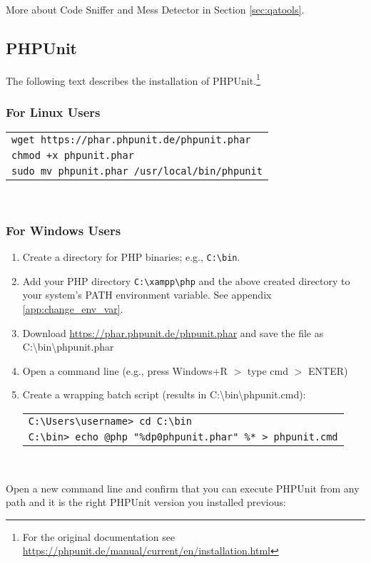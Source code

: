 \noindent
More about Code Sniffer and Mess Detector in Section \ref{sec:qatools}.

\newpage
\subsection{PHPUnit}
The following text describes the installation of PHPUnit.\footnote{For the original documentation see \url{https://phpunit.de/manual/current/en/installation.html}}

\subsubsection{For Linux Users}
\begin{tabular}{l}
	\texttt{wget https://phar.phpunit.de/phpunit.phar}\\
	\texttt{chmod +x phpunit.phar}\\
	\texttt{sudo mv phpunit.phar /usr/local/bin/phpunit}\\
\end{tabular}\\

\subsubsection{For Windows Users}
\begin{enumerate}
	\item Create a directory for PHP binaries; e.g., \texttt{C:\textbackslash bin}.
	\item Add your PHP directory \texttt{C:\textbackslash xampp\textbackslash php} and the above created directory to your system's PATH environment variable. See appendix \ref{app:change_env_var}.
	\item Download \url{https://phar.phpunit.de/phpunit.phar} and save the file as C:\textbackslash bin\textbackslash phpunit.phar
	\item Open a command line (e.g., press Windows+R $ > $ type cmd $ > $ ENTER)
	\item Create a wrapping batch script (results in C:\textbackslash bin\textbackslash phpunit.cmd):\\
	
		\begin{tabular}{l}
			\texttt{C:\textbackslash Users\textbackslash username> cd C:\textbackslash bin}\\
			\texttt{C:\textbackslash bin> echo @php "\%\raisebox{-0.9ex}{\textasciitilde}dp0phpunit.phar" \%* > phpunit.cmd}\\
		\end{tabular}\\
\end{enumerate}
Open a new command line and confirm that you can execute PHPUnit from any path and it is the right PHPUnit version you installed previous:\\

